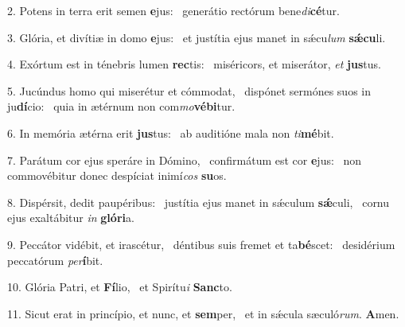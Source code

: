 2. Potens in terra erit semen \textbf{e}jus: \ast\  generátio rectórum bene\textit{di}\textbf{cé}tur.\

3. Glória, et divítiæ in domo \textbf{e}jus: \ast\  et justítia ejus manet in sǽcu\textit{lum} \textbf{sǽ}\textbf{cu}li.\

4. Exórtum est in ténebris lumen \textbf{rec}tis: \ast\  miséricors, et miserátor, \textit{et} \textbf{jus}tus.\

5. Jucúndus homo qui miserétur et cómmodat, \dag\  dispónet sermónes suos in ju\textbf{dí}cio: \ast\  quia in ætérnum non com\textit{mo}\textbf{vé}\textbf{bi}tur.\

6. In memória ætérna erit \textbf{jus}tus: \ast\  ab auditióne mala non \textit{ti}\textbf{mé}bit.\

7. Parátum cor ejus speráre in Dómino, \dag\  confirmátum est cor \textbf{e}jus: \ast\  non commovébitur donec despíciat inimí\textit{cos} \textbf{su}os.\

8. Dispérsit, dedit paupéribus: \dag\  justítia ejus manet in sǽculum \textbf{sǽ}culi, \ast\  cornu ejus exaltábitur \textit{in} \textbf{gló}\textbf{ri}a.\

9. Peccátor vidébit, et irascétur, \dag\  déntibus suis fremet et ta\textbf{bé}scet: \ast\  desidérium peccatórum \textit{per}\textbf{í}bit.\

10. Glória Patri, et \textbf{Fí}lio, \ast\  et Spirítu\textit{i} \textbf{Sanc}to.\

11. Sicut erat in princípio, et nunc, et \textbf{sem}per, \ast\  et in sǽcula sæculó\textit{rum}. \textbf{A}men.\

